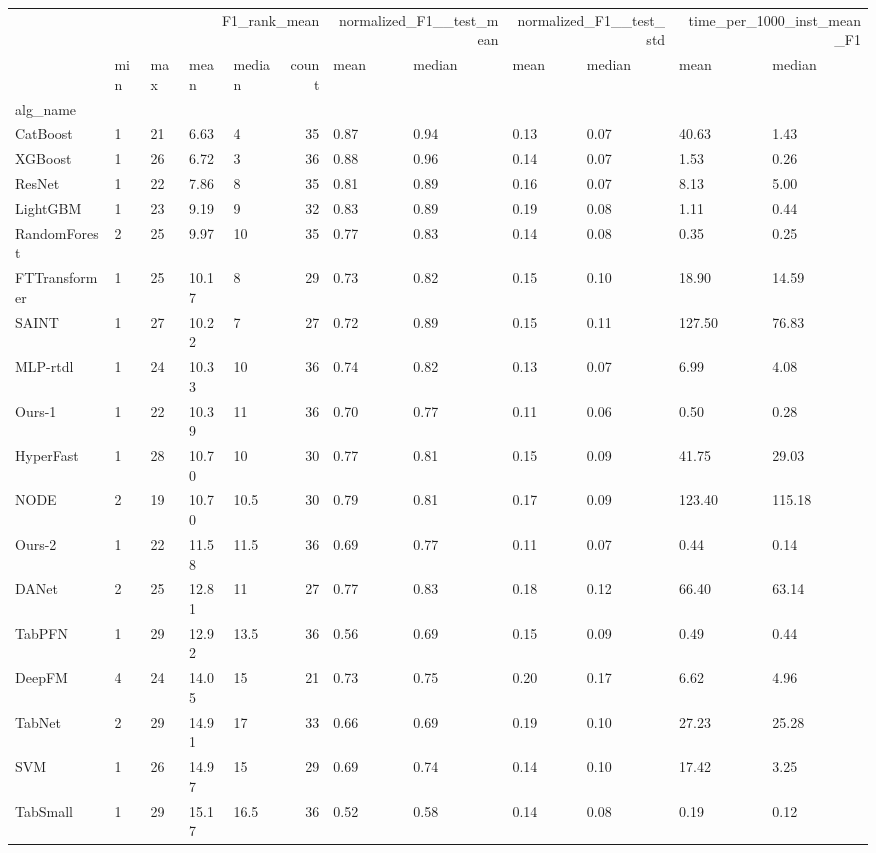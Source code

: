\begin{tabular}{lllllrllllll}
\toprule
 & \multicolumn{5}{r}{F1_rank_mean} & \multicolumn{2}{r}{normalized_F1__test_mean} & \multicolumn{2}{r}{normalized_F1__test_std} & \multicolumn{2}{r}{time_per_1000_inst_mean_F1} \\
 & min & max & mean & median & count & mean & median & mean & median & mean & median \\
alg_name &  &  &  &  &  &  &  &  &  &  &  \\
\midrule
CatBoost & 1 & 21 & 6.63 & 4 & 35 & 0.87 & 0.94 & 0.13 & 0.07 & 40.63 & 1.43 \\
XGBoost & 1 & 26 & 6.72 & 3 & 36 & 0.88 & 0.96 & 0.14 & 0.07 & 1.53 & 0.26 \\
ResNet & 1 & 22 & 7.86 & 8 & 35 & 0.81 & 0.89 & 0.16 & 0.07 & 8.13 & 5.00 \\
LightGBM & 1 & 23 & 9.19 & 9 & 32 & 0.83 & 0.89 & 0.19 & 0.08 & 1.11 & 0.44 \\
RandomForest & 2 & 25 & 9.97 & 10 & 35 & 0.77 & 0.83 & 0.14 & 0.08 & 0.35 & 0.25 \\
FTTransformer & 1 & 25 & 10.17 & 8 & 29 & 0.73 & 0.82 & 0.15 & 0.10 & 18.90 & 14.59 \\
SAINT & 1 & 27 & 10.22 & 7 & 27 & 0.72 & 0.89 & 0.15 & 0.11 & 127.50 & 76.83 \\
MLP-rtdl & 1 & 24 & 10.33 & 10 & 36 & 0.74 & 0.82 & 0.13 & 0.07 & 6.99 & 4.08 \\
Ours-1 & 1 & 22 & 10.39 & 11 & 36 & 0.70 & 0.77 & 0.11 & 0.06 & 0.50 & 0.28 \\
HyperFast & 1 & 28 & 10.70 & 10 & 30 & 0.77 & 0.81 & 0.15 & 0.09 & 41.75 & 29.03 \\
NODE & 2 & 19 & 10.70 & 10.5 & 30 & 0.79 & 0.81 & 0.17 & 0.09 & 123.40 & 115.18 \\
Ours-2 & 1 & 22 & 11.58 & 11.5 & 36 & 0.69 & 0.77 & 0.11 & 0.07 & 0.44 & 0.14 \\
DANet & 2 & 25 & 12.81 & 11 & 27 & 0.77 & 0.83 & 0.18 & 0.12 & 66.40 & 63.14 \\
TabPFN & 1 & 29 & 12.92 & 13.5 & 36 & 0.56 & 0.69 & 0.15 & 0.09 & 0.49 & 0.44 \\
DeepFM & 4 & 24 & 14.05 & 15 & 21 & 0.73 & 0.75 & 0.20 & 0.17 & 6.62 & 4.96 \\
TabNet & 2 & 29 & 14.91 & 17 & 33 & 0.66 & 0.69 & 0.19 & 0.10 & 27.23 & 25.28 \\
SVM & 1 & 26 & 14.97 & 15 & 29 & 0.69 & 0.74 & 0.14 & 0.10 & 17.42 & 3.25 \\
TabSmall & 1 & 29 & 15.17 & 16.5 & 36 & 0.52 & 0.58 & 0.14 & 0.08 & 0.19 & 0.12 \\

\end{tabular}
